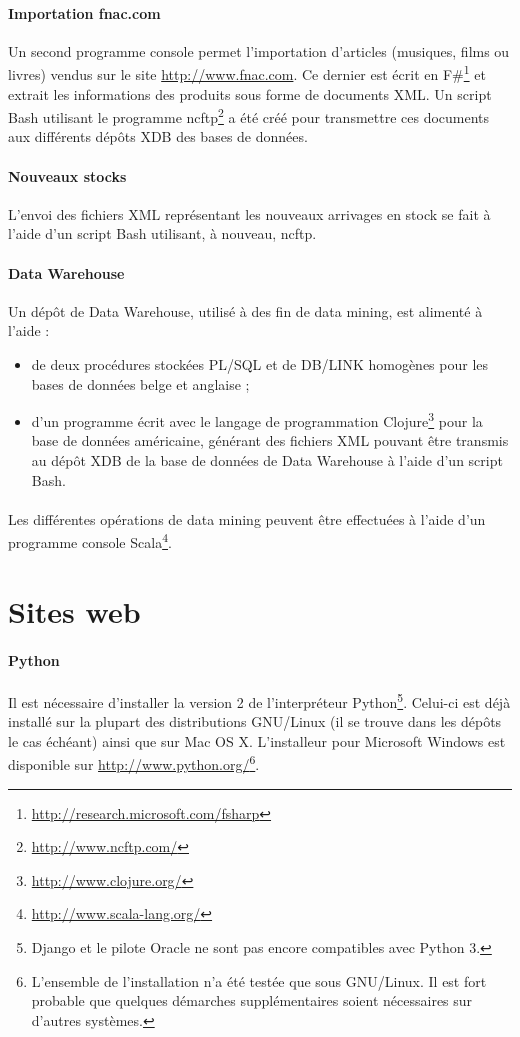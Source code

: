 \documentclass[a4paper,12pt,french]{article}
\begin{document}
    \paragraph{Importation fnac.com}
    Un second programme console permet l'importation d'articles (musiques, films
ou livres) vendus sur le site \url{http://www.fnac.com}. Ce dernier est écrit en
F\#\footnote{\url{http://research.microsoft.com/fsharp}} et extrait les
informations des produits sous forme de documents XML. Un script Bash utilisant
le programme ncftp\footnote{\url{http://www.ncftp.com/}} a été créé pour
transmettre ces documents aux différents dépôts XDB des bases de données.

    \paragraph{Nouveaux stocks}
    L'envoi des fichiers XML représentant les nouveaux arrivages en stock se
fait à l'aide d'un script Bash utilisant, à nouveau, ncftp.

    \paragraph{Data Warehouse}
    Un dépôt de Data Warehouse, utilisé à des fin de data mining, est alimenté
à l'aide :
    \begin{itemize}
        \item de deux procédures stockées PL/SQL et de DB/LINK homogènes pour
les bases de données belge et anglaise ;
        \item d'un programme écrit avec le langage de programmation
Clojure\footnote{\url{http://www.clojure.org/}} pour la base de données
américaine, générant des fichiers XML pouvant être transmis au dépôt XDB de la
base de données de Data Warehouse à l'aide d'un script Bash.
    \end{itemize}

    \paragraph{}
    Les différentes opérations de data mining peuvent être effectuées à l'aide
d'un programme console Scala\footnote{\url{http://www.scala-lang.org/}}.

\section{Sites web}
    \paragraph{Python}
    Il est nécessaire d'installer la version 2 de l'interpréteur
Python\footnote{Django et le pilote Oracle ne sont pas encore compatibles avec
Python 3.}. Celui-ci est déjà installé sur la plupart des distributions
GNU/Linux (il se trouve dans les dépôts le cas échéant) ainsi que sur Mac OS X.
L'installeur pour Microsoft Windows est disponible sur
\url{http://www.python.org/}\footnote{L'ensemble de l'installation n'a été
testée que sous GNU/Linux. Il est fort probable que quelques démarches
supplémentaires soient nécessaires sur d'autres systèmes.}.
    
\end{document}
